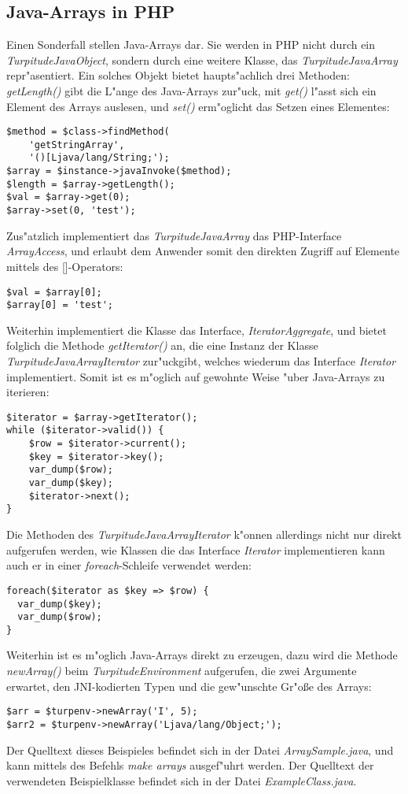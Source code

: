 \subsection{Java-Arrays in PHP}
\label{sec:app1:arrays}

Einen Sonderfall stellen Java-Arrays dar. Sie werden in PHP nicht durch ein \emph{TurpitudeJavaObject},
sondern durch eine weitere Klasse, das \emph{TurpitudeJavaArray} repr"asentiert. Ein solches Objekt bietet
haupts"achlich drei Methoden: \emph{getLength()} gibt die L"ange des Java-Arrays zur"uck, mit \emph{get()} 
l"asst sich ein Element des Arrays auslesen, und \emph{set()} erm"oglicht das Setzen eines Elementes:
\begin{lstlisting}[caption=Normaler Zugriff auf ein TurpitudeJavaArray]
$method = $class->findMethod(
    'getStringArray', 
    '()[Ljava/lang/String;');
$array = $instance->javaInvoke($method);
$length = $array->getLength();
$val = $array->get(0);
$array->set(0, 'test');
\end{lstlisting}
Zus"atzlich implementiert das \emph{TurpitudeJavaArray} das PHP-Interface \emph{ArrayAccess}, und erlaubt
dem Anwender somit den direkten Zugriff auf Elemente mittels des []-Operators:
\begin{lstlisting}[caption=Klammern-Operator]
$val = $array[0];
$array[0] = 'test';
\end{lstlisting}
Weiterhin implementiert die Klasse das Interface, \emph{IteratorAggregate}, und bietet folglich die Methode
\emph{getIterator()} an, die eine Instanz der Klasse \emph{TurpitudeJavaArrayIterator} zur"uckgibt, welches
wiederum das Interface \emph{Iterator} implementiert. Somit ist es m"oglich auf gewohnte Weise "uber
Java-Arrays zu iterieren:
\begin{lstlisting}[caption=Iterator]
$iterator = $array->getIterator();
while ($iterator->valid()) {
    $row = $iterator->current();
    $key = $iterator->key();
    var_dump($row);
    var_dump($key);
    $iterator->next();
}
\end{lstlisting}
Die Methoden des \emph{TurpitudeJavaArrayIterator} k"onnen allerdings nicht nur direkt aufgerufen werden,
wie Klassen die das Interface \emph{Iterator} implementieren kann auch er in einer \emph{foreach}-Schleife
verwendet werden:
\begin{lstlisting}[caption=Iterator in einer foreach-Schleife]
foreach($iterator as $key => $row) {
  var_dump($key);
  var_dump($row);
}
\end{lstlisting}
Weiterhin ist es m"oglich Java-Arrays direkt zu erzeugen, dazu wird die Methode \emph{newArray()} beim
\emph{TurpitudeEnvironment} aufgerufen, die zwei Argumente erwartet, den JNI-kodierten Typen
und die gew"unschte Gr"o\ss e des Arrays:
\begin{lstlisting}[caption=Erzeugen von Arrays]
$arr = $turpenv->newArray('I', 5);
$arr2 = $turpenv->newArray('Ljava/lang/Object;');
\end{lstlisting}

Der Quelltext dieses Beispieles befindet sich in der Datei \emph{ArraySample.java}, 
und kann mittels des Befehls \emph{make arrays} ausgef"uhrt werden. Der Quelltext der
verwendeten Beispielklasse befindet sich in der Datei \emph{ExampleClass.java}.

